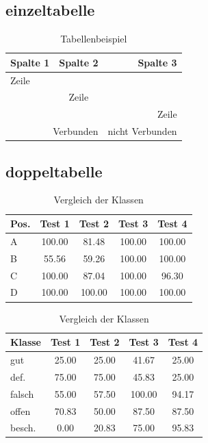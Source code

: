 \subsection{einzeltabelle}
\begin{table}[H]
	\centering
	\caption{Tabellenbeispiel}
	\label{tab:example}
	\begin{tabular}{|l|c|r|}
		\hline
		Spalte 1 & Spalte 2 & Spalte 3 \\
		\hline
		Zeile  &  &  \\
		\hline
		& Zeile &  \\
		\hline
		&  & Zeile \\
		\hline
		\multicolumn{2}{|r|}{Verbunden}	& nicht Verbunden \\
		\hline
	\end{tabular}
\end{table}

\subsection{doppeltabelle}
\begin{table}[H]
\centering
\begin{minipage}[t]{0.48\textwidth}
\centering
\caption{Vergleich der Kamerapositionen}
\label{tab:compare_per_camera}
\begin{tabular}{|l|c|c|c|c|}
\hline
Pos. & Test 1 & Test 2 & Test 3 & Test 4 \\
\hline
A & 100.00 & 81.48 & 100.00 & 100.00 \\
B & 55.56 & 59.26 & 100.00 & 100.00 \\
C & 100.00 & 87.04 & 100.00 & 96.30 \\
D & 100.00 & 100.00 & 100.00 & 100.00 \\
\hline
\end{tabular}
\end{minipage}\hspace{1em}
\begin{minipage}[t]{0.48\textwidth}
\centering
\caption{Vergleich der Klassen}
\label{tab:compare_per_class}
\begin{tabular}{|l|c|c|c|c|}
\hline
Klasse & Test 1 & Test 2 & Test 3 & Test 4 \\
\hline
gut & 25.00 & 25.00 & 41.67 & 25.00 \\
def. & 75.00 & 75.00 & 45.83 & 25.00 \\
falsch & 55.00 & 57.50 & 100.00 & 94.17 \\
offen & 70.83 & 50.00 & 87.50 & 87.50 \\
besch. & 0.00 & 20.83 & 75.00 & 95.83 \\
\hline
\end{tabular}
\end{minipage}
\end{table}

